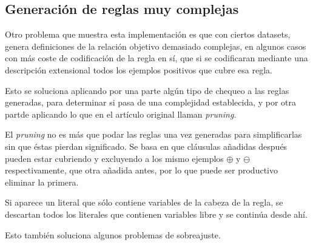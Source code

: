 \subsection{Generación de reglas muy complejas}
Otro problema que muestra esta implementación es que con ciertos datasets, genera definiciones de la relación objetivo demasiado complejas, en algunos casos con más coste de codificación de la regla en sí, que si se codificaran mediante una descripción extensional todos los ejemplos positivos que cubre esa regla.

Esto se soluciona aplicando por una parte algún tipo de chequeo a las reglas generadas, para determinar si pasa de una complejidad establecida, y por otra partde aplicando lo que en el artículo original llaman \emph{pruning}.

El \emph{pruning} no es más que podar las reglas una vez generadas para simplificarlas sin que éstas pierdan significado. Se basa en que cláusulas añadidas después pueden estar cubriendo y excluyendo a los mismo ejemplos $\oplus$ y $\ominus$ respectivamente, que otra añadida antes, por lo que puede ser productivo eliminar la primera.

Si aparece un literal que sólo contiene variables de la cabeza de la regla, se descartan todos los literales que contienen variables libre y se continúa desde ahí.

Esto también soluciona algunos problemas de sobreajuste.
